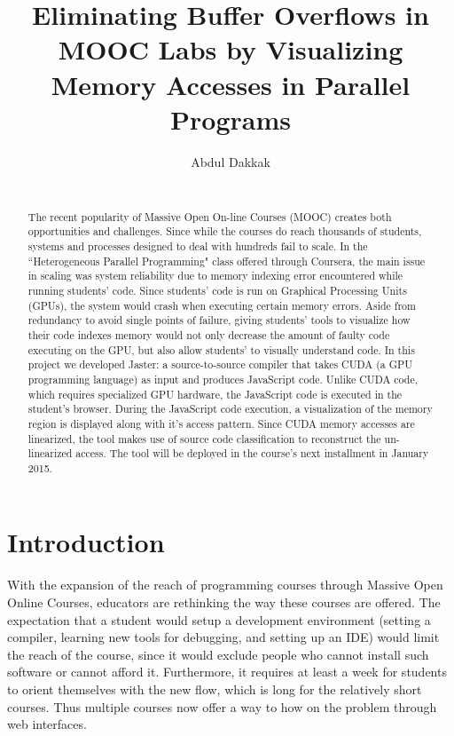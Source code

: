 \documentclass[nocopyrightspace]{sigchi}
\begin{document}
\title{Eliminating Buffer Overflows in MOOC Labs by Visualizing Memory Accesses in Parallel Programs}

\author{
  \alignauthor Abdul Dakkak\\
    \\
    }

\maketitle

\begin{abstract}
  The recent popularity of Massive Open On-line Courses (MOOC) creates
  both opportunities and challenges. Since while the courses do reach
  thousands of students, systems and processes designed to deal with
  hundreds fail to scale. In the ``Heterogeneous Parallel Programming" class
  offered through Coursera, the main issue in scaling was system reliability due
  to memory indexing error encountered while running students' code.
  Since students' code is run on Graphical Processing Units (GPUs), the system
  would crash when executing certain memory errors. Aside from redundancy to avoid
  single points of failure, giving students' tools to visualize how their code
  indexes memory would not only decrease the amount of faulty code executing on
  the GPU, but also allow students' to visually understand code.
  In this project we developed Jaster: a source-to-source compiler that takes
  CUDA (a GPU programming language) as input and produces JavaScript code.
  Unlike CUDA code, which requires
  specialized GPU hardware, the JavaScript code is executed
  in the student's browser. During the JavaScript code execution, a visualization
  of the memory region is displayed along with it's access pattern.
  Since CUDA memory accesses are linearized, the tool makes use of source code
  classification to reconstruct the un-linearized access.
  The tool will be deployed in the course's next installment in January 2015.
\end{abstract}


\section{Introduction}


With the expansion of the reach of programming courses through Massive Open Online Courses,
educators are rethinking the way these courses are offered. The expectation that a 
student would setup a development environment (setting a compiler, learning 
new tools for debugging, and setting up an IDE) would limit the reach of the course, since
it would exclude people who cannot install such software or cannot afford it. 
Furthermore, it requires at least a week for students to orient themselves with the 
new flow, which is long for the relatively short courses.
Thus multiple courses now offer a way to how on the problem through web interfaces.
\end{document}
